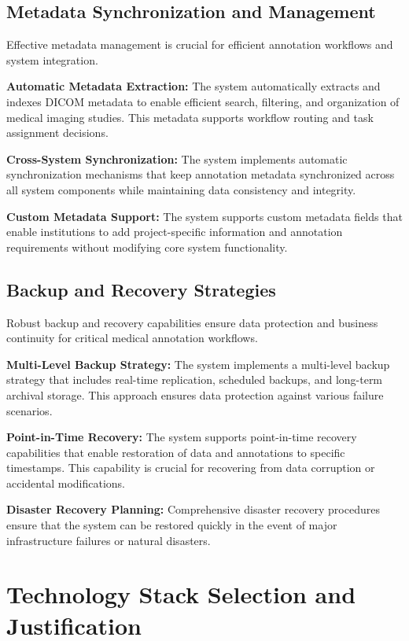 \subsection{Metadata Synchronization and Management}

Effective metadata management is crucial for efficient annotation workflows and system integration.

\textbf{Automatic Metadata Extraction:} The system automatically extracts and indexes DICOM metadata to enable efficient search, filtering, and organization of medical imaging studies. This metadata supports workflow routing and task assignment decisions.

\textbf{Cross-System Synchronization:} The system implements automatic synchronization mechanisms that keep annotation metadata synchronized across all system components while maintaining data consistency and integrity.

\textbf{Custom Metadata Support:} The system supports custom metadata fields that enable institutions to add project-specific information and annotation requirements without modifying core system functionality.

\subsection{Backup and Recovery Strategies}

Robust backup and recovery capabilities ensure data protection and business continuity for critical medical annotation workflows.

\textbf{Multi-Level Backup Strategy:} The system implements a multi-level backup strategy that includes real-time replication, scheduled backups, and long-term archival storage. This approach ensures data protection against various failure scenarios.

\textbf{Point-in-Time Recovery:} The system supports point-in-time recovery capabilities that enable restoration of data and annotations to specific timestamps. This capability is crucial for recovering from data corruption or accidental modifications.

\textbf{Disaster Recovery Planning:} Comprehensive disaster recovery procedures ensure that the system can be restored quickly in the event of major infrastructure failures or natural disasters.

\section{Technology Stack Selection and Justification}

